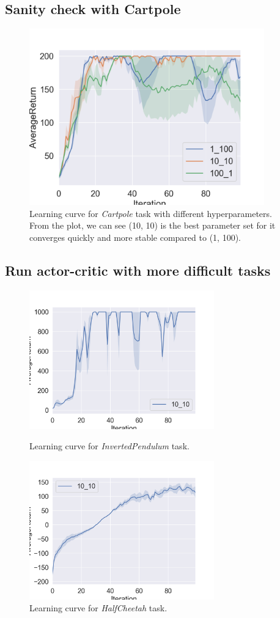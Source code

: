 \documentclass[12pt]{article}
\begin{document}
\subsection{Sanity check with Cartpole}
\begin{figure}[!h]
\centering
\includegraphics[width=4in]{Figure_4.png}
\caption{Learning curve for \textit{Cartpole} task with different hyperparameters. From the plot, we can see (10, 10) is the best parameter set for it converges quickly and more stable compared to (1, 100).}
\end{figure}

\subsection{Run actor-critic with more difficult tasks}
\begin{figure}[!h]
\centering
\begin{minipage}[t]{0.48\textwidth}
\centering
\includegraphics[width=8cm]{Figure_5.png}
\caption{Learning curve for \textit{InvertedPendulum} task.}
\end{minipage}
\begin{minipage}[t]{0.48\textwidth}
\centering
\includegraphics[width=8cm]{Figure_6.png}
\caption{Learning curve for \textit{HalfCheetah} task.}
\end{minipage}
\end{figure}
\end{document}
